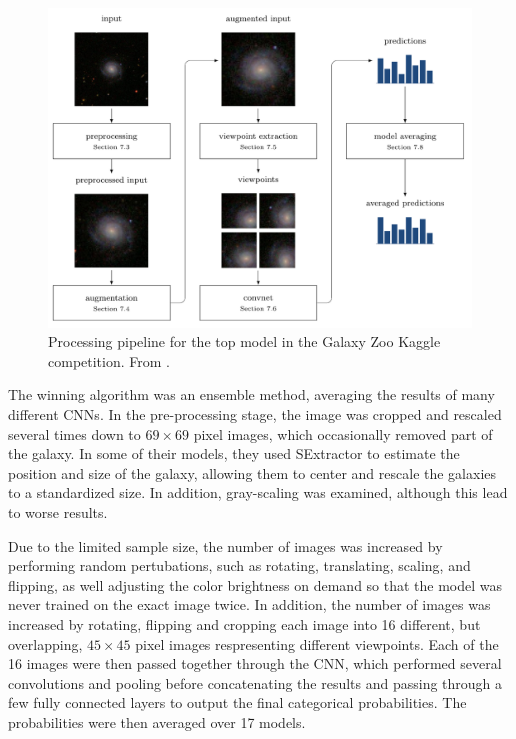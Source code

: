 \documentclass{article}
\begin{document}
\begin{figure}[h]
  \centering
	\includegraphics[width=130mm]{../img/GZ2_network.png}
  \caption{Processing pipeline for the top model in the Galaxy Zoo Kaggle competition. From \cite{2015MNRAS.450.1441D}.}
  \label{fig:GZ2_network}
\end{figure}


The winning algorithm was an ensemble method, averaging the results of many different CNNs. In the pre-processing stage, the image was cropped and rescaled several times down to $69 \times 69$ pixel images, which occasionally removed part of the galaxy. In some of their models, they used SExtractor to estimate the position and size of the galaxy, allowing them to center and rescale the galaxies to a standardized size. In addition, gray-scaling was examined, although this lead to worse results.

Due to the limited sample size, the number of images was increased by performing random pertubations, such as rotating, translating, scaling, and flipping, as well adjusting the color brightness on demand so that the model was never trained on the exact image twice. In addition, the number of images was increased by rotating, flipping and cropping each image into 16 different, but overlapping, $45 \times 45$ pixel images respresenting different viewpoints. Each of the 16 images were then passed together through the CNN, which performed several convolutions and pooling before concatenating the results and passing through a few fully connected layers to output the final categorical probabilities. The probabilities were then averaged over 17 models.
\end{document}
